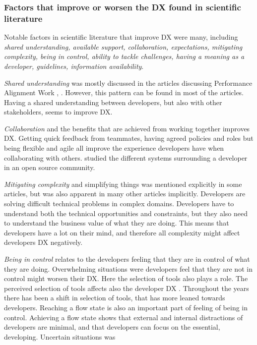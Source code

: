 \documentclass[english, 12pt, a4paper, sci, utf8, a-1b, online]{aaltothesis}
\begin{document}
\subsubsection{Factors that improve or worsen the DX found in scientific literature}

Notable factors in scientific literature that improve DX were many, including \textit{shared understanding,	available support, collaboration, expectations, mitigating complexity, being in control, ability to tackle challenges, having a meaning as a developer, guidelines, information availability}.

\textit{Shared understanding} was mostly discussed in the articles discussing Performance Alignment Work \parencite{paw}, \parencite{how-developers-experience-team-performance}. However, this pattern can be found in most of the articles. Having a shared understanding between developers, but also with other stakeholders, seems to improve DX.

\textit{Collaboration} and the benefits that are achieved from working together improves DX. Getting quick feedback from teammates, having agreed policies and roles but being flexible and agile all improve the experience developers have when collaborating with others. \textcite{entering-an-ecosystem} studied the different systems surrounding a developer in an open source community.

\textit{Mitigating complexity} and simplifying things was mentioned explicitly in some articles, but was also apparent in many other articles implicitly. Developers are solving difficult technical problems in complex domains. Developers have to understand both the technical opportunities and constraints, but they also need to understand the business value of what they are doing. This means that developers have a lot on their mind, and therefore all complexity might affect developers DX negatively.

\textit{Being in control} relates to the developers feeling that they are in control of what they are doing. Overwhelming situations were developers feel that they are not in control might worsen their DX. Here the selection of tools also plays a role. The perceived selection of tools affects also the developer DX \parencite{software-developers-as-users}. Throughout the years there has been a shift in selection of tools, that has more leaned towards developers. Reaching a flow state is also an important part of feeling of being in control. Achieving a flow state shows that external and internal distractions of developers are minimal, and that developers can focus on the essential, developing. Uncertain situations was
\end{document}
